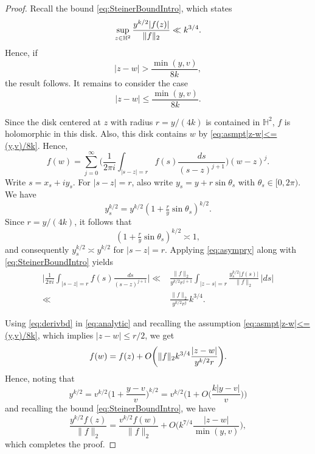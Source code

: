 \documentclass[12pt, a4paper]{amsart}
\theoremstyle{definition}
\newcommand {\1} {\mathbf{1}}
\newcommand {\Hb} {\mathbb {H}}
\numberwithin{equation}{section}
\begin{document}
\begin{proof}

Recall the bound \eqref{eq:SteinerBoundIntro}, which states
\begin{equation} \notag
\sup_{z\in \Hb^{2}} \frac{y^{k/2}|f(z)|}{\lVert f \rVert_2} \ll k^{3/4}.
\end{equation}
Hence, if $$|z-w| > \frac{\min(y,v)}{8k},$$ the result follows.
It remains to consider the case
\begin{equation}
\label{eq:asmpt|z-w|<= (y,v)/8k}
|z-w| \le \frac{\min(y,v)}{8k}.
\end{equation}


\vspace{2mm}


Since the disk centered at $z$ with radius $r=y/(4k)$ is contained in $\Hb^{2}$, $f$ is holomorphic in this disk. Also, this disk contains $w$ by \eqref{eq:asmpt|z-w|<= (y,v)/8k}. Hence,
\begin{equation} \label{eq:analytic}
f(w)=\sum_{j=0}^{\infty} \bigg(\frac{1}{2\pi i} \int_{|s-z|=r} f(s) \frac{ds}{(s-z)^{j+1}} \bigg)(w-z)^j.
\end{equation}
Write $s=x_s+iy_s$. For $|s-z|=r$, also write $y_s=y+r\sin \theta_s$ with $\theta_s \in [0,2\pi)$. We have
\[
y_s^{k/2}=y^{k/2}\left(1+\tfrac{r}{y} \sin \theta_s\right)^{k/2}.
\]
Since $r=y/(4k)$, it follows that
\begin{equation} \label{eq:asympry}
\left(1+\tfrac{r}{y} \sin \theta_s\right)^{k/2} \asymp 1,
\end{equation}
and consequently $y_s^{k/2} \asymp y^{k/2}$ for $|s-z|=r$. Applying \eqref{eq:asympry} along with \eqref{eq:SteinerBoundIntro} yields
\begin{equation} \label{eq:derivbd}
\begin{split}
\bigg|\frac{1}{2\pi i} \int_{|s-z|=r} f(s) \frac{ds}{(s-z)^{j+1}} \bigg| \ll & \frac{\lVert f \rVert_2}{y^{k/2} r^{j+1}} \int_{|z-s|=r} \frac{y_s^{k/2}|f(s)|}{\lVert f \rVert_2} \, |ds| \\
\ll & \frac{\lVert f \rVert_2}{ y^{k/2}r^j} k^{3/4}.
\end{split}
\end{equation}

Using \eqref{eq:derivbd} in \eqref{eq:analytic} and recalling the assumption \eqref{eq:asmpt|z-w|<= (y,v)/8k}, which implies $|z-w|\le r/2$, we get
\begin{equation} \notag
f(w)=f(z)+O\bigg( \lVert f \rVert_2 k^{3/4} \frac{ |z-w|}{y^{k/2}r}\bigg).
\end{equation}
Hence, noting that
\[
y^{k/2}=v^{k/2}\bigg(1+\frac{y-v}{v}\bigg)^{k/2}=v^{k/2}\bigg( 1+O\bigg( \frac{k|y-v|}{v}\bigg)\bigg)
\]
and recalling the bound \eqref{eq:SteinerBoundIntro}, we have \[\frac{y^{k/2}f(z)}{\lVert f \rVert_2}=\frac{v^{k/2}f(w)}{\lVert f \rVert_2}+O\bigg(k^{7/4}  \frac{|z-w|}{\min(y,v)} \bigg),\]
which completes the proof.
\end{proof}
\end{document}
